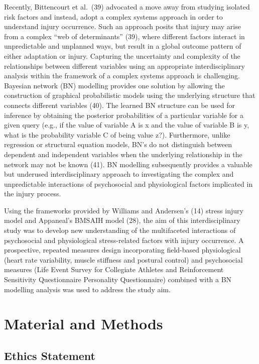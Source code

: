 \documentclass[
  english,
  man]{apa6}
\begin{document}
Recently, Bittencourt et al.~(39) advocated a move away from studying isolated risk factors and instead, adopt a complex systems approach in order to understand injury occurrence.
Such an approach posits that injury may arise from a complex ``web of determinants'' (39), where different factors interact in unpredictable and unplanned ways, but result in a global outcome pattern of either adaptation or injury.
Capturing the uncertainty and complexity of the relationships between different variables using an appropriate interdisciplinary analysis within the framework of a complex systems approach is challenging.
Bayesian network (BN) modelling provides one solution by allowing the construction of graphical probabilistic models using the underlying structure that connects different variables (40).
The learned BN structure can be used for inference by obtaining the posterior probabilities of a particular variable for a given query (e.g., if the value of variable A is x and the value of variable B is y, what is the probability variable C of being value z?).
Furthermore, unlike regression or structural equation models, BN's do not distinguish between dependent and independent variables when the underlying relationship in the network may not be known (41).
BN modelling subsequently provides a valuable but underused interdisciplinary approach to investigating the complex and unpredictable interactions of psychosocial and physiological factors implicated in the injury process.

Using the frameworks provided by Williams and Andersen's (14) stress injury model and Appaneal's BMSAIH model (28), the aim of this interdisciplinary study was to develop new understanding of the multifaceted interactions of psychosocial and physiological stress-related factors with injury occurrence.
A prospective, repeated measures design incorporating field-based physiological (heart rate variability, muscle stiffness and postural control) and psychosocial measures (Life Event Survey for Collegiate Athletes and Reinforcement Sensitivity Questionnaire Personality Questionnaire) combined with a BN modelling analysis was used to address the study aim.

\hypertarget{material-and-methods}{%
\section{Material and Methods}\label{material-and-methods}}

\hypertarget{ethics-statement}{%
\subsection{Ethics Statement}\label{ethics-statement}}
\end{document}
